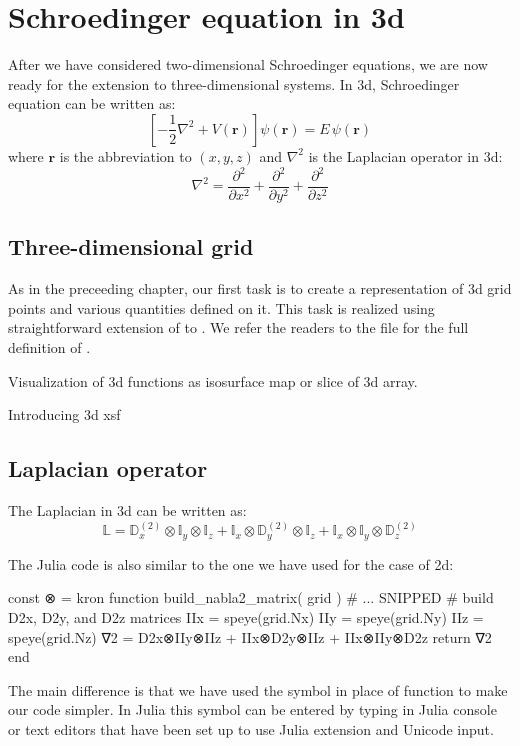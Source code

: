 \chapter{Schroedinger equation in 3d}
\label{chap:sch_3d}

After we have considered two-dimensional Schroedinger equations, we are now ready for
the extension to three-dimensional systems. In 3d, Schroedinger equation can be
written as:
\begin{equation}
\left[ -\frac{1}{2}\nabla^2 + V(\mathbf{r}) \right] \psi(\mathbf{r}) = E\,\psi(\mathbf{r})
\end{equation}
where $\mathbf{r}$ is the abbreviation to $(x,y,z)$ and
%
$\nabla^2$ is the Laplacian operator in 3d:
\begin{equation}
\nabla^2 = \frac{\partial^2}{\partial x^2} + \frac{\partial^2}{\partial y^2} +
\frac{\partial^2}{\partial z^2}
\end{equation}

\section{Three-dimensional grid}

As in the preceeding chapter, our first task is to create a representation of 3d grid
points and various quantities defined on it. This task is realized using straightforward
extension of  to .
We refer the readers to the file  for the full definition of
.

Visualization of 3d functions as isosurface map or slice of 3d array.

Introducing 3d xsf

\section{Laplacian operator}

The Laplacian in 3d can be written as:
\begin{equation}
\mathbb{L} = \mathbb{D}^{(2)}_{x} \otimes \mathbb{I}_{y} \otimes \mathbb{I}_{z} +
\mathbb{I}_{x} \otimes \mathbb{D}^{(2)}_{y} \otimes \mathbb{I}_{z} +
\mathbb{I}_{x} \otimes \mathbb{I}_{y} \otimes \mathbb{D}^{(2)}_{z}
\end{equation}

The Julia code is also similar to the one we have used for the case of 2d:
%
\begin{juliacode}
const ⊗ = kron
function build_nabla2_matrix( grid )
    # ... SNIPPED
    # build D2x, D2y, and D2z matrices
    IIx = speye(grid.Nx)
    IIy = speye(grid.Ny)
    IIz = speye(grid.Nz)    
    ∇2 = D2x⊗IIy⊗IIz + IIx⊗D2y⊗IIz + IIx⊗IIy⊗D2z
    return ∇2
end
\end{juliacode}
%
The main difference is that we have used the symbol  in place
of  function to make our code simpler. In Julia this symbol
can be entered by typing \txtinline{\otimes} in Julia console or text editors
that have been set up to use Julia extension and Unicode input.


